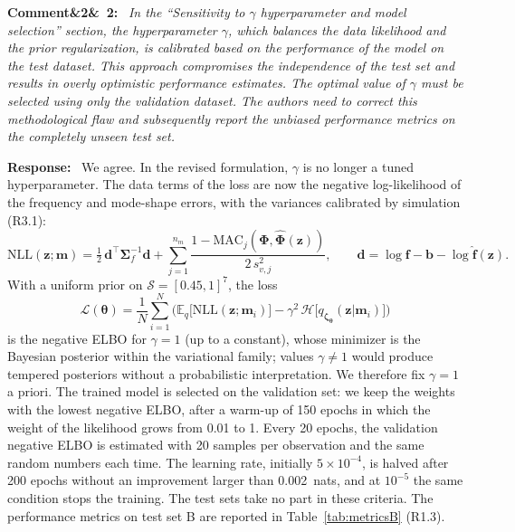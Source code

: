 \documentclass[11pt]{article}
\newenvironment{rcomment}[1]{\par\bigskip\noindent\textbf{Comment\ifx&#1&\else\ #1\fi:}\ \itshape}{\par}
\newenvironment{response}{\par\smallskip\noindent\color{resp}\textbf{Response:}\ }{\par}
\newcommand{\m}{\mathbf{m}}
\newcommand{\z}{\mathbf{z}}
\newcommand{\f}{\mathbf{f}}
\begin{document}
\begin{rcomment}{2}
In the ``Sensitivity to $\gamma$ hyperparameter and model selection'' section, the hyperparameter $\gamma$, which
balances the data likelihood and the prior regularization, is calibrated based on the performance of the model on the
test dataset. This approach compromises the independence of the test set and results in overly optimistic performance
estimates. The optimal value of $\gamma$ must be selected using only the validation dataset. The authors need to
correct this methodological flaw and subsequently report the unbiased performance metrics on the completely unseen test
set.
\end{rcomment}

\begin{response}
We agree. In the revised formulation, $\gamma$ is no longer
a tuned hyperparameter. The data terms of the loss are now the negative log-likelihood of the frequency and mode-shape
errors, with the variances calibrated by simulation (R3.1):
\begin{equation}
\mathrm{NLL}(\z;\m)=\tfrac12\,\mathbf{d}^{\top}\bm{\Sigma}_f^{-1}\mathbf{d}
+\sum_{j=1}^{n_m}\frac{1-\mathrm{MAC}_j(\bm{\Phi},\hat{\bm{\Phi}}(\z))}{2\,s_{v,j}^2},\qquad
\mathbf{d}=\log\f-\mathbf{b}-\log\hat{\f}(\z).
\label{eq:nll}
\end{equation}
With a uniform prior on $\mathcal{S}=[0.45,1]^7$, the loss
\begin{equation}
\mathcal{L}(\bm\theta)=\frac1N\sum_{i=1}^N\Big(\mathbb{E}_{q}\big[\mathrm{NLL}(\z;\m_i)\big]
-\gamma^2\,\mathcal{H}\big[q_{\bm\zeta_{\bm\theta}}(\z|\m_i)\big]\Big)
\label{eq:loss}
\end{equation}
is the negative ELBO for $\gamma=1$ (up to a constant), whose minimizer is the Bayesian posterior within the variational
family; values $\gamma\neq1$ would produce tempered posteriors without a probabilistic interpretation. We
therefore fix $\gamma=1$ a priori. The trained model is selected on the validation set: we keep the weights with the
lowest negative ELBO, after a warm-up of 150 epochs in which the weight of the likelihood grows from 0.01 to 1. Every 20
epochs, the validation negative ELBO is estimated with 20 samples per observation and the same random numbers each time.
The learning rate, initially $5\times10^{-4}$, is halved after 200 epochs without an improvement larger than 0.002~nats,
and at $10^{-5}$ the same condition stops the training. 
The test sets take no part in these criteria. The performance metrics on test set B are reported in
Table~\ref{tab:metricsB} (R1.3).


\end{response}
\end{document}
